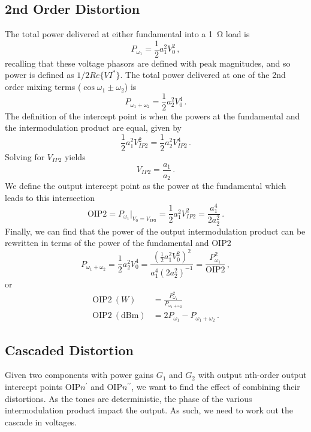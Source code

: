\subsection{2nd Order Distortion}
The total power delivered at either fundamental into a \qty{1}{\ohm} load is
\begin{equation}
    P_{\omega_{1}} = \frac{1}{2}a_1^2V_0^2\,,
\end{equation}
recalling that these voltage phasors are defined with peak magnitudes, and so power is defined as $1/2Re\{VI^*\}$.
The total power delivered at one of the 2nd order mixing terms ($\cos{\omega_1\pm\omega_2}$) is
\begin{equation}
    P_{\omega_1+\omega_2} = \frac{1}{2}a_2^2V_0^4\,.
\end{equation}
The definition of the intercept point is when the powers at the fundamental and the intermodulation product are equal, given by
\begin{equation}
    \frac{1}{2}a_1^2V_{IP2}^2 = \frac{1}{2}a_2^2V_{IP2}^4\,.
\end{equation}
Solving for $V_{IP2}$ yields
\begin{equation}
    V_{IP2} = \frac{a_1}{a_2}\,.
\end{equation}
We define the output intercept point as the power at the fundamental which leads to this intersection
\begin{equation}
    \text{OIP2} = P_{\omega_1}|_{V_0=V_{IP2}} = \frac{1}{2}a_1^2V_{IP2}^2 = \frac{a_1^4}{2a_2^2}\,.
\end{equation}
Finally, we can find that the power of the output intermodulation product can be rewritten in terms of the power of the fundamental and OIP2
\begin{equation}
    P_{\omega_1+\omega_2} = \frac{1}{2}a_2^2V_0^4 = \frac{\left(\frac{1}{2}a_1^2V_0^2\right)^2}{a_1^4(2a_2^2)^{-1}} = \frac{P_{\omega_{1}}^2}{\text{OIP2}}\,,
    \label{eq:2nd_order_oip2_powers}
\end{equation}
or
\begin{align}
    \text{OIP2}~(W) &= \frac{P_{\omega_{1}}^2}{P_{\omega_1+\omega_2}} \\
    \text{OIP2}~(\text{dBm}) &= 2P_{\omega_{1}} - P_{\omega_1+\omega_2}\,.
\end{align}

\subsection{Cascaded Distortion}
Given two components with power gains $G_1$ and $G_2$ with output nth-order output intercept points $\text{OIP}n^\prime$ and $\text{OIP}n^{\prime\prime}$, we want to find the effect of combining their distortions.
As the tones are deterministic, the phase of the various intermodulation product impact the output.
As such, we need to work out the cascade in voltages.

